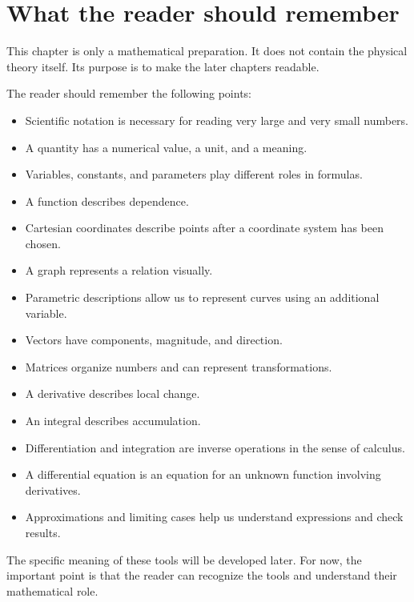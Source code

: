 \section{What the reader should remember}

This chapter is only a mathematical preparation. It does not contain the physical theory itself. Its purpose is to make the later chapters readable.

The reader should remember the following points:
\begin{itemize}
    \item Scientific notation is necessary for reading very large and very small numbers.
    \item A quantity has a numerical value, a unit, and a meaning.
    \item Variables, constants, and parameters play different roles in formulas.
    \item A function describes dependence.
    \item Cartesian coordinates describe points after a coordinate system has been chosen.
    \item A graph represents a relation visually.
    \item Parametric descriptions allow us to represent curves using an additional variable.
    \item Vectors have components, magnitude, and direction.
    \item Matrices organize numbers and can represent transformations.
    \item A derivative describes local change.
    \item An integral describes accumulation.
    \item Differentiation and integration are inverse operations in the sense of calculus.
    \item A differential equation is an equation for an unknown function involving derivatives.
    \item Approximations and limiting cases help us understand expressions and check results.
\end{itemize}

The specific meaning of these tools will be developed later. For now, the important point is that the reader can recognize the tools and understand their mathematical role.
